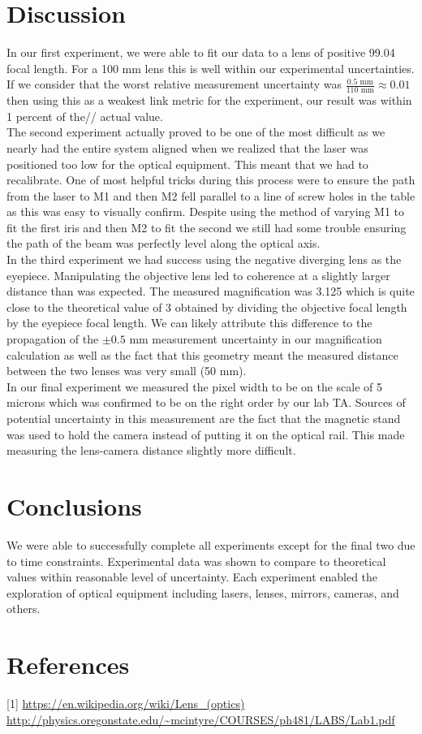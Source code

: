 \documentclass[letter, 11pt, onecolumn]{article}
\begin{document}
	\section*{Discussion} 
	In our first experiment, we were able to fit our data to a lens of positive 99.04 focal length. For a 100 mm lens this is well within our experimental uncertainties. If we consider that the worst relative measurement uncertainty was $\frac{0.5\text{ mm}}{110\text{ mm}} \approx 0.01$ then using this as a weakest link metric for the experiment, our result was within 1 percent of the// actual value. \\
	
	\noindent The second experiment actually proved to be one of the most difficult as we nearly had the entire system aligned when we realized that the laser was positioned too low for the optical equipment. This meant that we had to recalibrate. One of most helpful tricks during this process were to ensure the path from the laser to M1 and then M2 fell parallel to a line of screw holes in the table as this was easy to visually confirm. Despite using the method of varying M1 to fit the first iris and then M2 to fit the second we still had some trouble ensuring the path of the beam was perfectly level along the optical axis.\\
	
	\noindent In the third experiment we had success using the negative diverging lens as the eyepiece. Manipulating the objective lens led to coherence at a slightly larger distance than was expected. The measured magnification was 3.125 which is quite close to the theoretical value of 3 obtained by dividing the objective focal length by the eyepiece focal length. We can likely attribute this difference to the propagation of the $\pm 0.5$ mm measurement uncertainty in our magnification calculation as well as the fact that this geometry meant the measured distance between the two lenses was very small (50 mm). \\
	
	\noindent In our final experiment we measured the pixel width to be on the scale of 5 microns which was confirmed to be on the right order by our lab TA. Sources of potential uncertainty in this measurement are the fact that the magnetic stand was used to hold the camera instead of putting it on the optical rail. This made measuring the lens-camera distance slightly more difficult. 
	
	\section*{Conclusions}
	We were able to successfully complete all experiments except for the final two due to time constraints. Experimental data was shown to compare to theoretical values within reasonable level of uncertainty. Each experiment enabled the exploration of optical equipment including lasers, lenses, mirrors, cameras, and others. 
	
	\section*{References} 
	[1] \url{https://en.wikipedia.org/wiki/Lens_(optics)} \\ 
	\noindent[2] \url{http://physics.oregonstate.edu/~mcintyre/COURSES/ph481/LABS/Lab1.pdf}
\end{document}

